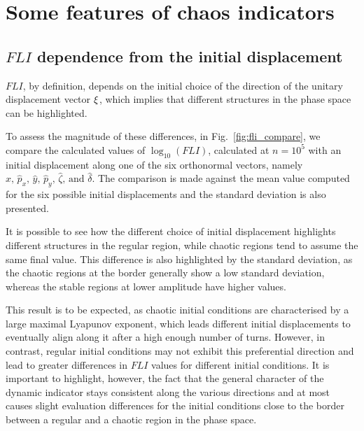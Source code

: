 \section{Some features of chaos indicators}

\subsection{$FLI$ dependence from the initial displacement}

$FLI$, by definition, depends on the initial choice of the direction of the unitary displacement vector $\vb{\xi}$, which implies that different structures in the phase space can be highlighted.

To assess the magnitude of these differences, in Fig.~\ref{fig:fli_compare}, we compare the calculated values of $\log_{10}({FLI})$, calculated at $n=10^5$ with an initial displacement along one of the six orthonormal vectors, namely $\hat{x},\,\hat{p}_x,\,\hat{y},\,\hat{p}_y,\,\hat{\zeta},\,\text{and }\hat{\delta}$. The comparison is made against the mean value computed for the six possible initial displacements and the standard deviation is also presented.

It is possible to see how the different choice of initial displacement highlights different structures in the regular region, while chaotic regions tend to assume the same final value. This difference is also highlighted by the standard deviation, as the chaotic regions at the border generally show a low standard deviation, whereas the stable regions at lower amplitude have higher values.

This result is to be expected, as chaotic initial conditions are characterised by a large maximal Lyapunov exponent, which leads different initial displacements to eventually align along it after a high enough number of turns. However, in contrast, regular initial conditions may not exhibit this preferential direction and lead to greater differences in $FLI$ values for different initial conditions. It is important to highlight, however, the fact that the general character of the dynamic indicator stays consistent along the various directions and at most causes slight evaluation differences for the initial conditions close to the border between a regular and a chaotic region in the phase space.

